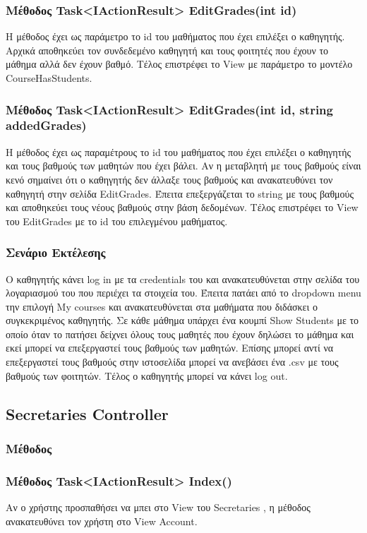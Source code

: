 \documentclass[12pt]{article}
\begin{document}
	\subsubsection{Μέθοδος Task<IActionResult> EditGrades(int id)}
	Η μέθοδος έχει ως παράμετρο το id του μαθήματος που έχει επιλέξει ο καθηγητής. Αρχικά αποθηκεύει τον συνδεδεμένο καθηγητή και τους φοιτητές που έχουν το μάθημα αλλά δεν έχουν βαθμό. Τέλος επιστρέφει το View με παράμετρο το μοντέλο CourseHasStudents.
	
	\subsubsection{Μέθοδος Task<IActionResult> EditGrades(int id, string addedGrades)}
	Η μέθοδος έχει ως παραμέτρους το id  του μαθήματος που έχει επιλέξει ο καθηγητής και τους βαθμούς των μαθητών που έχει βάλει. Αν η μεταβλητή με τους βαθμούς είναι κενό σημαίνει ότι ο καθηγητής δεν άλλαξε τους βαθμούς και ανακατευθύνει τον καθηγητή στην σελίδα EditGrades. Έπειτα επεξεργάζεται το string με τους βαθμούς και αποθηκεύει τους νέους βαθμούς στην βάση δεδομένων. Τέλος επιστρέφει το View του EditGrades με το id του επιλεγμένου μαθήματος.
	
	\subsubsection{Σενάριο Εκτέλεσης}
	Ο καθηγητής κάνει log in με τα credentials του και ανακατευθύνεται στην σελίδα του λογαριασμού του που περιέχει τα στοιχεία του. Έπειτα πατάει από το dropdown menu την επιλογή My courses και ανακατευθύνεται στα μαθήματα που διδάσκει ο συγκεκριμένος καθηγητής. Σε κάθε μάθημα υπάρχει ένα κουμπί Show Students με το οποίο όταν το πατήσει δείχνει όλους τους μαθητές που έχουν δηλώσει το μάθημα και εκεί μπορεί να επεξεργαστεί τους βαθμούς των μαθητών. Επίσης μπορεί αντί να επεξεργαστεί τους βαθμούς στην ιστοσελίδα μπορεί να ανεβάσει ένα .csv με τους βαθμούς των φοιτητών. Τέλος ο καθηγητής μπορεί να κάνει log out.
	
	\subsection{Secretaries Controller}
	
		\subsubsection{Μέθοδος }
	
	
	\subsubsection{Μέθοδος Task<IActionResult> Index() }
	Αν ο χρήστης προσπαθήσει να μπει στο View του Secretaries , η μέθοδος ανακατευθύνει τον χρήστη στο View Account.
	
\end{document}
